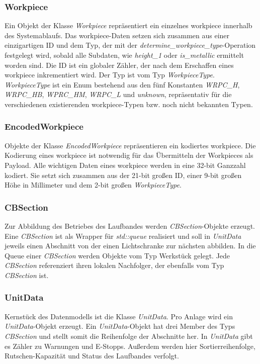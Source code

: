 \subsubsection{Workpiece}
Ein Objekt der Klasse \textit{Workpiece} repräsentiert ein einzelnes \gls{workpiece} innerhalb des Systemablaufs.
Das \gls{workpiece}-Daten setzen sich zusammen aus einer einzigartigen ID und dem Typ, der mit der \textit{determine\_workpiece\_type}-Operation
festgelegt wird, sobald alle Subdaten, wie \textit{height\_1} oder \textit{is\_metallic} ermittelt worden sind.
Die ID ist ein globaler Zähler, der nach dem Erschaffen eines \gls{workpiece} inkrementiert wird.
Der Typ ist vom Typ \textit{WorkpieceType}.
\textit{WorkpieceType} ist ein Enum bestehend aus den fünf Konstanten \textit{WRPC\_H},
\textit{WRPC\_HB}, \textit{WPRC\_HM}, \textit{WRPC\_L} und \textit{unknown},
repräsentativ für die verschiedenen existierenden \gls{workpiece}-Typen bzw. noch nicht bekannten Typen.

\subsubsection{EncodedWorkpiece}
Objekte der Klasse \textit{EncodedWorkpiece} repräsentieren ein kodiertes \gls{workpiece}.
Die Kodierung eines \gls{workpiece} ist notwendig für das Übermitteln der Workpieces als Payload.
Alle wichtigen Daten eines \gls{workpiece} werden in eine 32-bit Ganzzahl kodiert.
Sie setzt sich zusammen aus der 21-bit großen ID, einer 9-bit großen Höhe in Millimeter und
dem 2-bit großen \textit{WorkpieceType}.

\subsubsection{CBSection}
Zur Abbildung des Betriebes des Laufbandes werden \textit{CBSection}-Objekte erzeugt.
Eine \textit{CBSection} ist als Wrapper für \textit{std::queue} realisiert und soll in \textit{UnitData}
jeweils einen Abschnitt von der einen Lichtschranke zur nächsten abbilden.
In die Queue einer \textit{CBSection} werden Objekte vom Typ Werkstück gelegt.
Jede \textit{CBSection} referenziert ihren lokalen Nachfolger, der ebenfalls vom Typ \textit{CBSection} ist.

\subsubsection{UnitData}
Kernstück des Datenmodells ist die Klasse \textit{UnitData}. Pro Anlage wird ein \textit{UnitData}-Objekt
erzeugt.
Ein \textit{UnitData}-Objekt hat drei Member des Typs \textit{CBSection} und stellt somit die
Reihenfolge der Abschnitte her.
In \textit{UnitData} gibt es Zähler zu Warnungen und E-Stopps.
Außerdem werden hier Sortierreihenfolge, Rutschen-Kapazität und Status des Laufbandes verfolgt.

